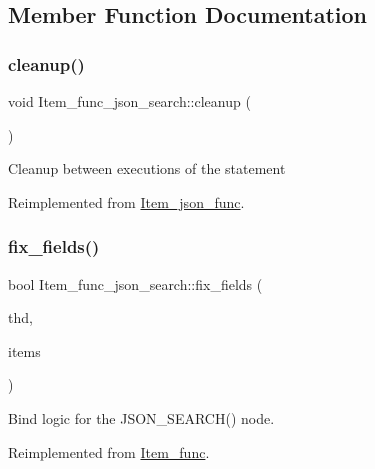 \subsection{Member Function Documentation}
\mbox{\label{classItem__func__json__search_a2c5ac3f1a34532493a36bdb37241d48d}} 
\subsubsection{\texorpdfstring{cleanup()}{cleanup()}}
{\footnotesize\ttfamily void Item\+\_\+func\+\_\+json\+\_\+search\+::cleanup (\begin{DoxyParamCaption}{ }\end{DoxyParamCaption})\hspace{0.3cm}{\ttfamily [virtual]}}

Cleanup between executions of the statement 

Reimplemented from \mbox{\hyperlink{classItem__json__func_a848300ad1b593a1ec577a3e0cafd68dd}{Item\+\_\+json\+\_\+func}}.

\mbox{\label{classItem__func__json__search_a0dfedf6959caef2f7c63e7c333e9b785}} 
\subsubsection{\texorpdfstring{fix\+\_\+fields()}{fix\_fields()}}
{\footnotesize\ttfamily bool Item\+\_\+func\+\_\+json\+\_\+search\+::fix\+\_\+fields (\begin{DoxyParamCaption}\item[{T\+HD $\ast$}]{thd,  }\item[{\mbox{\hyperlink{classItem}{Item}} $\ast$$\ast$}]{items }\end{DoxyParamCaption})\hspace{0.3cm}{\ttfamily [virtual]}}

Bind logic for the J\+S\+O\+N\+\_\+\+S\+E\+A\+R\+C\+H() node. 

Reimplemented from \mbox{\hyperlink{classItem__func}{Item\+\_\+func}}.

